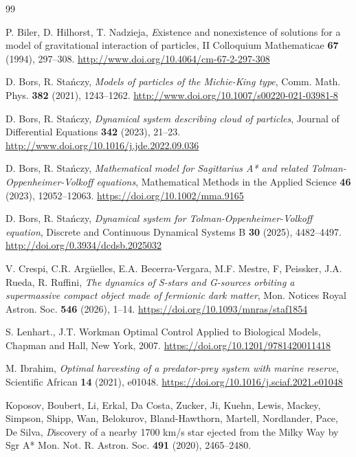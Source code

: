 \documentclass[reqno,10pt]{article}
\theoremstyle{definition}
\numberwithin{equation}{section}
\numberwithin{theorem}{section}
\begin{document}
\begin{thebibliography}{99}

P. Biler, D. Hilhorst, T. Nadzieja,
{\textit 
Existence and nonexistence of solutions for a model of gravitational interaction of particles, II}
Colloquium Mathematicae \textbf{67}  (1994), 297--308.
\url{http://www.doi.org/10.4064/cm-67-2-297-308}

D. Bors, R. Stańczy, 
\textit{Models of particles of the Michie-King type},
Comm. Math. Phys. 
\textbf{382} (2021), 1243--1262.
\url{http://www.doi.org/10.1007/s00220-021-03981-8}

D. Bors, R. Stańczy, 
\textit{Dynamical system describing cloud of particles},
Journal of Differential Equations \textbf{342} (2023), 21--23.
\url{http://www.doi.org/10.1016/j.jde.2022.09.036}

D. Bors, R. Stańczy, 
\textit{Mathematical model for Sagittarius A* and related Tolman-Oppenheimer-Volkoff equations},
Mathematical Methods in the Applied Science \textbf{46} (2023), 12052--12063.
\url{ https://doi.org/10.1002/mma.9165}

D. Bors, R. Stańczy, 
\textit{Dynamical system for Tolman-Oppenheimer-Volkoff equation}, Discrete and Continuous Dynamical Systems B \textbf{30} (2025), 4482--4497.
\url{http://doi.org/0.3934/dcdsb.2025032}

V. Crespi, C.R. Arg\"uelles, E.A. Becerra-Vergara, M.F. Mestre, F, Peissker, J.A. Rueda, R. Ruffini,
\textit{The dynamics of S-stars and G-sources orbiting a supermassive compact object made of fermionic dark matter},
Mon. Notices Royal Astron. Soc. %
\textbf{546} (2026), 1--14. %
\url{https://doi.org/10.1093/mnras/staf1854} %

S. Lenhart., J.T. Workman
Optimal Control Applied to Biological Models,
Chapman and Hall, New York, 2007.
\url{https://doi.org/10.1201/9781420011418}

M. Ibrahim, 
\textit{Optimal harvesting of a predator-prey system with marine reserve}, Scientific African \textbf{14} (2021), e01048.
\url{https://doi.org/10.1016/j.sciaf.2021.e01048} 

Koposov, Boubert,  Li,  Erkal,  Da Costa, Zucker, Ji, Kuehn, Lewis, Mackey, Simpson, Shipp,   Wan, Belokurov, Bland-Hawthorn, Martell, Nordlander, Pace, De Silva,
{\textit Discovery of a nearby 1700 km/s star ejected from the Milky Way by Sgr A*}
Mon. Not. R. Astron. Soc. \textbf{491} (2020), 2465--2480.


\end{thebibliography}
\end{document}
